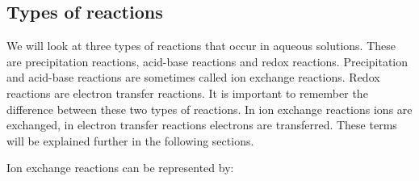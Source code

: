             \subsection{ Types of reactions}
            \nopagebreak
            \label{m38719*uid2131}
	We will look at three types of reactions that occur in aqueous solutions. These are precipitation reactions, acid-base reactions and redox reactions. Precipitation and acid-base reactions are sometimes called ion exchange reactions. Redox reactions are electron transfer reactions. It is important to remember the difference between these two types of reactions. In ion exchange reactions ions are exchanged, in electron transfer reactions electrons are transferred. These terms will be explained further in the following sections. 
      \par 
      \label{m38719*uid78332}
	Ion exchange reactions can be represented by:
	  \label{m38719*eid071534}\nopagebreak\noindent{}
	    
